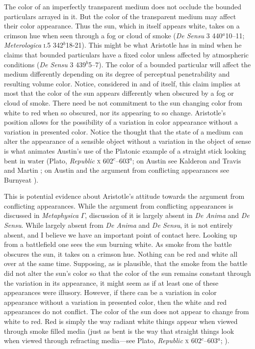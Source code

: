 The color of an imperfectly transparent medium does not occlude the bound\-ed particulars arrayed in it. But the color of the transparent medium may affect their color appearance. Thus the sun, which in itself appears white, takes on a crimson hue when seen through a fog or cloud of smoke (\emph{De Sensu} 3 440\( ^{a} \)10--11; \emph{Meterologica} \textsc{i}.5 342\( ^{b} \)18-21). This might be what Aristotle has in mind when he claims that bounded particulars have a fixed color unless affected by atmospheric conditions (\emph{De Sensu} 3 439\( ^{b} \)5--7). The color of a bounded particular will affect the medium differently depending on its degree of perceptual penetrability and resulting volume color. Notice, considered in and of itself, this claim implies at most that the color of the sun appears differently when obscured by a fog or cloud of smoke. There need be not commitment to the sun changing color from white to red when so obscured, nor its appearing to so change. Aristotle's position allows for the possibility of a variation in color appearance without a variation in presented color. Notice the thought that the state of a medium can alter the appearance of a sensible object without a variation in the object of sense is what animates Austin's \citeyearpar{Austin:1962lr} use of the Platonic example of a straight stick looking bent in water (Plato, \emph{Republic} \textsc{x} 602\( ^{c} \)--603\( ^{a} \); on Austin see Kalderon and Travis \citeyear{Kalderon:2010fk} and Martin \citeyear{Martin:2000nx}; on Austin and the argument from conflicting appearances see Burnyeat \citeyear{Burnyeat:1979mv}).

This is potential evidence about Aristotle's attitude towards the argument from conflicting appearances. While the argument from conflicting appearances is discussed in \emph{Metaphysica} \( \Gamma \), discussion of it is largely absent in \emph{De Anima} and \emph{De Sensu}. While largely absent from \emph{De Anima} and \emph{De Sensu}, it is not entirely absent, and I believe we have an important point of contact here. Looking up from a battlefield one sees the sun burning white. As smoke from the battle obscures the sun, it takes on a crimson hue. Nothing can be red and white all over at the same time. Supposing, as is plausible, that the smoke from the battle did not alter the sun's color so that the color of the sun remains constant through the variation in its appearance, it might seem as if at least one of these appearances were illusory. However, if there can be a variation in color appearance without a variation in presented color, then the white and red appearances do not conflict. The color of the sun does not appear to change from white to red. Red is simply the way radiant white things appear when viewed through smoke filled media (just as bent is the way that straight things look when viewed through refracting media---see Plato, \emph{Republic} \textsc{x} 602\( ^{c} \)--603\( ^{a} \); \citealt{Austin:1962lr}). 


